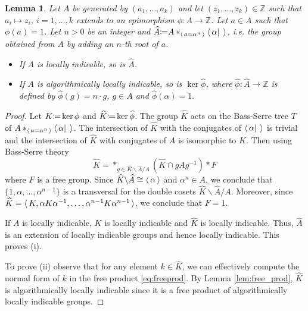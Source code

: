 \documentclass[12pt, a4paper]{amsart}
\newtheorem{Lem}[Thm]{Lemma}
\theoremstyle{remark}
\theoremstyle{definition}
\begin{document}
\begin{Lem}\label{lem:kerphi}
Let $A$ be generated by $(a_1,\dots, a_k)$ and let $(z_1,\dots,z_k)\in {\mathbb{Z}}$ such that $a_i\mapsto z_i$, $i=1,\dots,k$ extends to an epimorphism $\phi\colon A\to {\mathbb{Z}}$. Let $a\in A$ such that $\phi(a)=1$. Let $n>0$ be an integer  and $\widehat{A}{\mathrel{\mathop\mathchar"303A}\mkern-1.2mu=} A*_{{\langle\mkern3mu{ a= \alpha^n}\mkern3mu\rangle}}{\langle\mkern3mu{\alpha |\;}\mkern3mu\rangle}$, i.e. the group obtained from $A$ by adding an $n$-th root of $a$.
\begin{itemize}
\item[\textrm{(i)}] If $A$ is  locally indicable, so is $\widehat{A}$.
\item[\textrm{(ii)}] If $A$ is algorithmically locally indicable, so is $\ker \widehat{\phi}$, where $\widehat{\phi} \colon \widehat{A}\to {\mathbb{Z}}$ is  defined by $\widehat{\phi}(g)=n\cdot g$, $g\in A$ and $\widehat{\phi}(\alpha)=1.$
\end{itemize}
\end{Lem}
\begin{proof}

Let $K{\mathrel{\mathop\mathchar"303A}\mkern-1.2mu=} \ker \phi$ and $\widehat{K}{\mathrel{\mathop\mathchar"303A}\mkern-1.2mu=} \ker \widehat{\phi}$. The group $\widehat{K}$ acts on the Bass-Serre tree $T$ of $A*_{{\langle\mkern3mu{ a= \alpha^n}\mkern3mu\rangle}}{\langle\mkern3mu{\alpha |\;}\mkern3mu\rangle}$. The intersection of $\widehat{K}$ with the conjugates of ${\langle\mkern3mu{\alpha |\;}\mkern3mu\rangle}$ is trivial and the intersection of $\widehat{K}$ with conjugates of $A$ is isomorphic to $K$. Then using Bass-Serre theory \begin{equation}\label{eq:freeprod}\widehat{K}= *_{g\in \widehat{K}\backslash \widehat{A} /A}(\widehat{K}\cap gAg^{-1})*F\end{equation}  where $F$ is a free group. Since $\widehat{K}\backslash \widehat{A}\cong {\langle\mkern3mu{\alpha}\mkern3mu\rangle}$ and $\alpha^n\in A$, we conclude that $\{1,\alpha,\dots, \alpha^{n-1}\}$ is a transversal for the double cosets $\widehat{K}\backslash \widehat{A} /A$. Moreover, since $\widehat{K}={\langle\mkern3mu{K,\alpha K \alpha ^{-1},\dots, \alpha^{n-1}K \alpha^{n-1}}\mkern3mu\rangle}$, we conclude that $F=1$.

If $A$ is locally indicable, $K$ is locally indicable and $\widehat{K}$ is locally indicable. Thus, $\widehat{A}$ is an extension of locally indicable groups and hence locally indicable. This proves (i).

To prove (ii) observe that for any element $k \in \widehat{K}$, we can effectively compute the normal form of $k$ in the free product  \eqref{eq:freeprod}. By Lemma \ref{lem:free_prod}, $\widehat{K}$ is algorithmically locally indicable since it is a free product of algorithmically locally indicable groups.
\end{proof}
\end{document}
